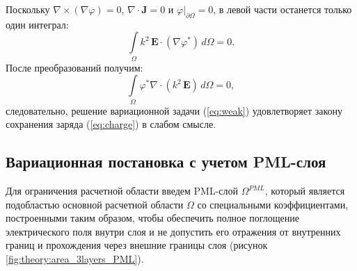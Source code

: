 \documentclass[a4paper,14pt]{article}
\begin{document}
Поскольку $\nabla \times (\nabla \varphi) = 0$, $\nabla \cdot \mathbf{J} = 0$ и $\left. \varphi \right | _{\partial \Omega} = 0$, в левой части останется только один интеграл:
\begin{equation*}
	\int\limits_\Omega k^{2}\, \mathbf{E} \cdot (\nabla \varphi^{*}) \,d\Omega = 0 .
\end{equation*}
После преобразований получим:
\begin{equation*}
	\int\limits_\Omega \varphi^{*} \nabla \cdot ( k^{2}\, \mathbf{E} ) \,d\Omega = 0 ,
\end{equation*}
следовательно, решение вариационной задачи (\ref{eq:weak}) удовлетворяет закону сохранения заряда (\ref{eq:charge}) в слабом смысле.


\subsection{Вариационная постановка с учетом PML-слоя}
Для ограничения расчетной области введем PML-слой ${\Omega^{PML}}$, который является подобластью основной расчетной области $\Omega$ со специальными коэффициентами, построенными таким образом, чтобы обеспечить полное поглощение электрического поля внутри слоя и не допустить его отражения от внутренних границ и прохождения через внешние границы слоя (рисунок \ref{fig:theory:area_3layers_PML}).
\end{document}
